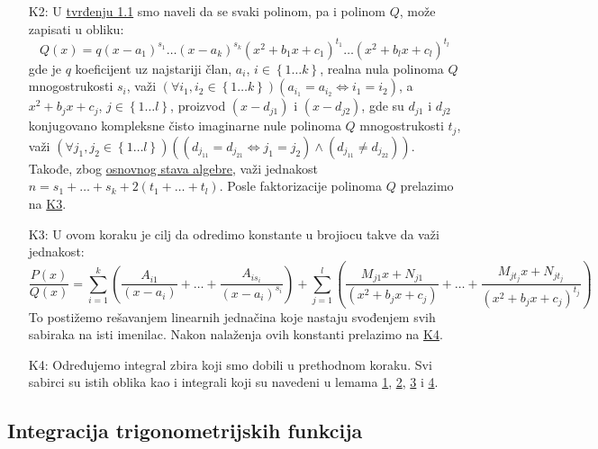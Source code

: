 \documentclass{article}
\begin{document}
\begin{algbox}
\begin{enumerate}[label=\text{K\arabic*}]
        \item[K2:]\label{algoritam_1_K2}
              U \hyperref[tvrđenje_1.1]{tvrđenju 1.1} smo naveli da se
              svaki polinom, pa i polinom $Q$, može zapisati u obliku:
              $$Q\left(x\right) = q\left(x - a_1\right)^{s_1}\dotsc\left(x-a_k\right)^{s_k}\left(x^2 + b_1x + c_1\right)^{t_1}\dotsc\left(x^2 + b_lx + c_l\right)^{t_l}$$
              gde je $q$ koeficijent uz najstariji član,
              $a_i$, $i\in\left\{1\dotsc k\right\}$, realna nula polinoma $Q$ mnogostrukosti $s_i$, važi $\left(\forall i_1,i_2\in\left\{1\dotsc k\right\}\right)\left(a_{i_1}=a_{i_2}\iff i_1=i_2\right)$,
              a $x^2+b_jx+c_j$, $j\in\left\{1\dotsc l\right\}$,
              proizvod $\left(x-d_{j1}\right)$ i $\left(x-d_{j2}\right)$,
              gde su $d_{j1}$ i $d_{j2}$ konjugovano kompleksne čisto imaginarne nule polinoma $Q$
              mnogostrukosti $t_j$, važi $\left(\forall j_1,j_2\in\left\{1\dotsc l\right\}\right)\left(\left(d_{j_11}=d_{j_21}\iff j_1=j_2\right)\land\left(d_{j_11}\neq d_{j_22}\right)\right)$.
              Takođe, zbog \hyperref[podsetnik_stava_1]{osnovnog stava algebre}, važi jednakost $n=s_1+\dotsc+s_k+2\left(t_1+\dotsc+t_l\right)$.
              Posle faktorizacije polinoma $Q$ prelazimo na \hyperref[algoritam_1_K3]{K3}.
        \item[K3:]\label{algoritam_1_K3}
              U ovom koraku je cilj da odredimo konstante u brojiocu takve da važi jednakost:
              $$\frac{P\left(x\right)}{Q\left(x\right)}=\sum_{i = 1}^k\left(\frac{A_{i1}}{\left(x-a_i\right)}+\dotsc+\frac{A_{is_i}}{\left(x-a_i\right)^{s_i}}\right) + \sum_{j = 1}^l\left( \frac{M_{j1}x + N_{j1}}{\left(x^2+b_jx+c_j\right)}+\dotsc+\frac{M_{jt_j}x + N_{jt_j}}{\left(x^2 + b_jx + c_j\right)^{t_j}}\right)$$
              To postižemo rešavanjem linearnih jednačina koje
              nastaju svođenjem svih sabiraka na isti imenilac.
              Nakon nalaženja ovih konstanti prelazimo na \hyperref[algoritam_1_K4]{K4}.
        \item[K4:]\label{algoritam_1_K4}
              Određujemo integral zbira koji smo dobili u prethodnom koraku.
              Svi sabirci su istih oblika kao i integrali koji su navedeni u lemama
              \hyperref[lema_1.1]{1}, \hyperref[lema_1.2]{2}, \hyperref[lema_1.3]{3} i \hyperref[lema_1.4]{4}.

    \end{enumerate}
\end{algbox}

\subsection{Integracija trigonometrijskih funkcija}
\end{document}
